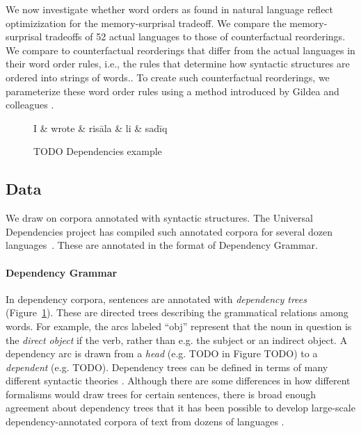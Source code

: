

We now investigate whether word orders as found in natural language reflect optimizization for the memory-surprisal tradeoff.
We compare the memory-surprisal tradeoffs of 52 actual languages to those of counterfactual reorderings.
We compare to counterfactual reorderings that differ from the actual languages in their word order rules, i.e., the rules that determine how syntactic structures are ordered into strings of words..
To create such counterfactual reorderings, we parameterize these word order rules using a method introduced by Gildea and colleagues \citep{gildea-optimizing-2007, gildea-grammars-2010, gildea-human-2015}.

\begin{figure}
\centering
\begin{dependency}[theme = simple]
   \begin{deptext}[column sep=1em]
	   I \&	   wrote \& risāla \& li \& sadīq  \\
   \end{deptext}
\end{dependency}
	\caption{TODO Dependencies example}\label{fig:dependency}
\end{figure}



\subsection{Data}
We draw on corpora annotated with syntactic structures.
The Universal Dependencies project has compiled such annotated corpora for several dozen languages~\citep{nivre-universal-2017}.
These are annotated in the format of Dependency Grammar.

\paragraph{Dependency Grammar}
In dependency corpora, sentences are annotated with \emph{dependency trees} (Figure~\ref{fig:dependency}).
These are directed trees describing the grammatical relations among words. For example, the arcs labeled ``obj'' represent that the noun in question is the \emph{direct object} if the verb, rather than e.g. the subject or an indirect object.
A dependency arc is drawn from a \emph{head} (e.g. TODO in Figure TODO) to a \emph{dependent} (e.g. TODO).
Dependency trees can be defined in terms of many different syntactic theories \citep{corbett1993heads}.
Although there are some differences in how different formalisms would draw trees for certain sentences, there is broad enough agreement about dependency trees that it has been possible to develop large-scale dependency-annotated corpora of text from dozens of languages \cite{nivre2017universal}.

